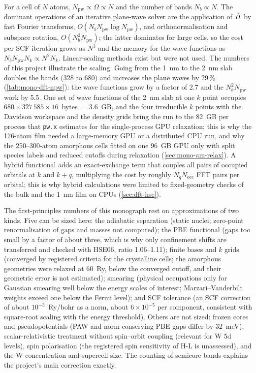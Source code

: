 For a cell of $N$ atoms, $N_{\mathrm{pw}} \propto \Omega \propto N$ and the number of bands $N_b \propto N$. The
dominant operations of an iterative plane-wave solver are the application of $\hat{H}$ by fast Fourier transforms,
$O(N_bN_{\mathrm{pw}}\log N_{\mathrm{pw}})$, and orthonormalisation and subspace rotation, $O(N_b^2N_{\mathrm{pw}})$; the
latter dominates for large cells, so the cost per SCF iteration grows as $N^3$ and the memory for the wave functions as
$N_bN_{\mathrm{pw}}N_k \propto N^2N_k$. Linear-scaling methods exist \citep{Goedecker1999} but were not used. The
numbers of this project illustrate the scaling. Going from the 1~nm to the 2~nm slab doubles the bands (328 to 680) and
increases the plane waves by 29\,\% (\cref{tab:mono-dft-npw}): the wave functions grow by a factor of 2.7 and the
$N_b^2N_{\mathrm{pw}}$ work by 5.5. One set of wave functions of the 2~nm slab at one $k$ point occupies
$680\times327\,585\times16$~bytes $=3.6$~GB, and the four irreducible $k$ points with the Davidson workspace and the
density grids bring the run to the 82~GB per process that \texttt{pw.x} estimates for the single-process GPU relaxation;
this is why the 176-atom film needed a large-memory GPU or a distributed CPU run, and why the 250--300-atom amorphous
cells fitted on one 96~GB GPU only with split species labels and reduced cutoffs during relaxation
(\cref{sec:mono-am-relax}). A hybrid functional adds an exact-exchange term that couples all pairs of occupied orbitals
at $k$ and $k+q$, multiplying the cost by roughly $N_q N_{\mathrm{occ}}$ FFT pairs per orbital; this is why hybrid calculations were
limited to fixed-geometry checks of the bulk and the 1~nm film on CPUs (\cref{sec:dft-hse}).

\begin{keyresult}
The first-principles numbers of this monograph rest on approximations of two kinds. Five can be sized here: the
adiabatic separation (static nuclei; zero-point renormalisation of gaps and masses not computed); the PBE functional (gaps too small by a factor of about three, which is
why only confinement shifts are transferred and checked with HSE06, ratio 1.06--1.11); finite bases and $k$ grids
(converged by registered criteria for the crystalline cells; the amorphous geometries were relaxed at 60~Ry, below the
converged cutoff, and their geometric error is not estimated); smearing
(physical occupations only for Gaussian smearing well below the energy scales of interest; Marzari--Vanderbilt weights
exceed one below the Fermi level); and SCF tolerance (an SCF correction of about $10^{-3}$~Ry/bohr as a norm, about $6\times10^{-5}$ per
component, consistent with square-root scaling with the energy threshold). Others are not sized: frozen cores and
pseudopotentials (PAW and norm-conserving PBE gaps differ by 32~meV), scalar-relativistic treatment without spin--orbit
coupling (relevant for W 5d levels), spin polarisation (the registered spin sensitivity of H-L is unassessed), and the W
concentration and supercell size. The counting of semicore bands explains the project's main correction 
exactly.
\end{keyresult}
